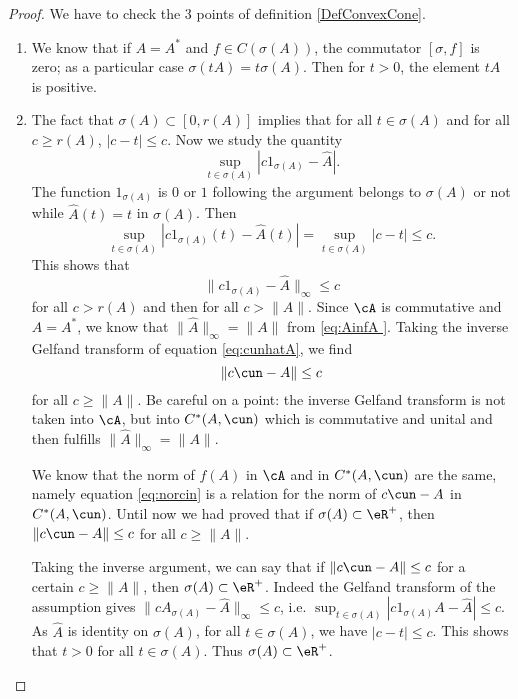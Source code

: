 \begin{proof}

    We have to check the \(3\) points of definition \ref{DefConvexCone}.
    \begin{enumerate}
            \item

                We know that if $A=A^*$ and $f\in C(\sigma(A))$, the commutator $[\sigma,f]$ is zero; as a particular case $\sigma(tA)=t\sigma(A)$. Then for $t>0$, the element $tA$ is positive.

            \item

                The fact that $\sigma(A)\subset [0,r(A)]$ implies that for all $t\in\sigma(A)$ and for all $c\geq r(A)$,  $| c-t |\leq c$. Now we study the quantity
                \[ 
                  \sup_{t\in \sigma(A)}| c1_{\sigma(A)}-\hat A |.
                \]
                The function $1_{\sigma(A)}$ is $0$ or $1$ following the argument belongs to $\sigma(A)$ or not while $\hat A(t)=t$ in $\sigma(A)$. Then
                \[ 
                  \sup_{t\in\sigma(A)}| c1_{\sigma(A)}(t)-\hat A(t) |=\sup_{t\in\sigma(A)}| c-t |\leq c.
                \]
                This shows that 
                \begin{equation} \label{eq:cunhatA}
                    \| c1_{\sigma(A)}-\hat A \|_{\infty}\leq c
                \end{equation}
                for all $c>r(A)$ and then for all $c>\| A \|$. Since $\cA$ is commutative and $A=A^*$, we know that $\| \hat A \|_{\infty}=\| A \|$ from  \eqref{eq:AinfA }. Taking the inverse Gelfand transform of equation \eqref{eq:cunhatA}, we find
                \begin{equation} \label{eq:norcin}
                    \| c\cun-A \|\leq c
                \end{equation}
                for all $c\geq\| A \|$. Be careful on a point: the inverse Gelfand transform is not taken into $\cA$, but into $C^*(A,\cun)$ which is commutative and unital and then fulfills $\| \hat A \|_{\infty}=\| A \|$.

                We know that the norm of $f(A)$ in $\cA$ and in $C^*(A,\cun)$ are the same, namely equation \eqref{eq:norcin} is a relation for the norm of $c\cun-A$ in $C^*(A,\cun)$. Until now we had proved that if $\sigma(A)\subset\eR^+$, then $\| c\cun-A \|\leq c$ for all $c\geq\| A \|$. 

                Taking the inverse argument, we can say that if $\| c\cun-A \|\leq c$ for a certain $c\geq\| A \|$, then $\sigma(A)\subset\eR^+$. Indeed the Gelfand transform of the assumption gives $\| cA_{\sigma(A)}-\hat A \|_{\infty}\leq c$, i.e. $\sup_{t\in\sigma(A)}| c1_{\sigma(A)}A-\hat A |\leq c$. As $\hat A$ is identity on $\sigma(A)$, for all $t\in\sigma(A)$, we have $| c-t |\leq c$. This shows that $t>0$ for all $t\in\sigma(A)$. Thus $\sigma(A)\subset\eR^+$.


\end{enumerate}
\end{proof}

